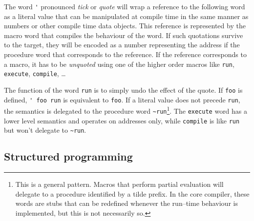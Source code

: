 \documentclass[12pt]{article}
\begin{document}
The word \verb|'| pronounced \emph{tick} or \emph{quote} will wrap a
reference to the following word as a literal value that can be
manipulated at compile time in the same manner as numbers or other
compile time data objects. This reference is represented by the macro
word that compiles the behaviour of the word. If such quotations
survive to the target, they will be encoded as a number representing
the address if the procedure word that corresponds to the
reference. If the reference corresponds to a macro, it has to be
\emph{unquoted} using one of the higher order macros like \verb|run|,
\verb|execute|, \verb|compile|, \ldots

The function of the word \verb|run| is to simply undo the effect of
the quote. If \verb|foo| is defined, \verb|' foo run| is equivalent to
\verb|foo|. If a literal value does not precede \verb|run|, the
semantics is delegated to the procedure word \verb|~run|\footnote{This
  is a general pattern. Macros that perform partial evaluation will
  delegate to a procedure identified by a tilde prefix. In the core
  compiler, these words are stubs that can be redefined whenever the
  run--time behaviour is implemented, but this is not necessarily
  so.}. The \verb|execute| word has a lower level semantics and
operates on addresses only, while \verb|compile| is like \verb|run|
but won't delegate to \verb|~run|.

\subsection{Structured programming}
\end{document}
